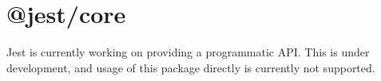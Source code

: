 \chapter{@jest/core}
\hypertarget{md_node__modules_2_0djest_2core_2README}{}\label{md_node__modules_2_0djest_2core_2README}
\label{md_node__modules_2_0djest_2core_2README_autotoc_md1385}%
%
 Jest is currently working on providing a programmatic API. This is under development, and usage of this package directly is currently not supported. 